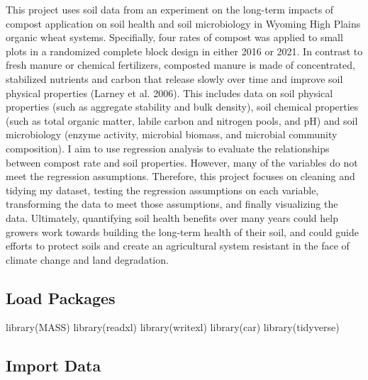 \documentclass[
]{article}
\newenvironment{Shaded}{\begin{snugshade}}{\end{snugshade}}
\newcommand{\FunctionTok}[1]{\textcolor[rgb]{0.00,0.00,0.00}{#1}}
\newcommand{\NormalTok}[1]{#1}
\begin{document}
This project uses soil data from an experiment on the long-term impacts
of compost application on soil health and soil microbiology in Wyoming
High Plains organic wheat systems. Specifially, four rates of compost
was applied to small plots in a randomized complete block design in
either 2016 or 2021. In contrast to fresh manure or chemical
fertilizers, composted manure is made of concentrated, stabilized
nutrients and carbon that release slowly over time and improve soil
physical properties (Larney et al. 2006). This includes data on soil
physical properties (such as aggregate stability and bulk density), soil
chemical properties (such as total organic matter, labile carbon and
nitrogen pools, and pH) and soil microbiology (enzyme activity,
microbial biomass, and microbial community composition). I aim to use
regression analysis to evaluate the relationships between compost rate
and soil properties. However, many of the variables do not meet the
regression assumptions. Therefore, this project focuses on cleaning and
tidying my dataset, testing the regression assumptions on each variable,
transforming the data to meet those assumptions, and finally visualizing
the data. Ultimately, quantifying soil health benefits over many years
could help growers work towards building the long-term health of their
soil, and could guide efforts to protect soils and create an
agricultural system resistant in the face of climate change and land
degradation.

\hypertarget{load-packages}{%
\subsection{Load Packages}\label{load-packages}}

\begin{Shaded}
\begin{Highlighting}[]
\FunctionTok{library}\NormalTok{(MASS)}
\FunctionTok{library}\NormalTok{(readxl)}
\FunctionTok{library}\NormalTok{(writexl)}
\FunctionTok{library}\NormalTok{(car)}
\FunctionTok{library}\NormalTok{(tidyverse)}
\end{Highlighting}
\end{Shaded}

\hypertarget{import-data}{%
\subsection{Import Data}\label{import-data}}
\end{document}

